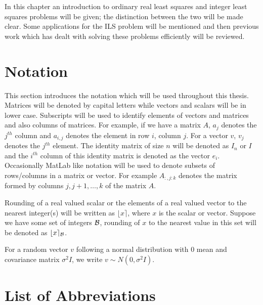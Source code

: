 \documentclass[12pt,Bold,letterpaper]{mcgilletdclass}
\begin{document}
In this chapter an introduction to ordinary real least squares and integer least squares problems will be given; the distinction between the two will be made clear. Some applications for the ILS problem will be mentioned and then previous work which has dealt with solving these problems efficiently will be reviewed. 

\section{Notation}

This section introduces the notation which will be used throughout this thesis. Matrices will be denoted by capital letters while vectors and scalars will be in lower case. Subscripts will be used to identify elements of vectors and matrices and also columns of matrices. For example, if we have a matrix $A$, $a_j$ denotes the $j^{th}$ column and $a_{i,j}$ denotes the element in row $i$, column $j$. For a vector $v$, $v_j$ denotes the $j^{th}$ element. The identity matrix of size $n$ will be denoted as $I_n$ or $I$ and the $i^{th}$ column of this identity matrix is denoted as the vector $e_i$. Occasionally MatLab like notation will be used to denote subsets of rows/columns in a matrix or vector. For example $A_{:,j:k}$ denotes the matrix formed by columns $j, j+1, \dots, k$ of the matrix $A$.

Rounding of a real valued scalar or the elements of a real valued vector to the nearest integer(s) will be written as $\lfloor x \rceil$, where $x$ is the scalar or vector. Suppose we have some set of integers ${\cal B}$, rounding of $x$ to the nearest value in this set will be denoted as  $\lfloor x \rceil_{{\cal B}}$.

For a random vector $v$ following a normal distribution with $0$ mean and covariance matrix $\sigma^2I$, we write $v \sim N(0,\sigma^2I)$.

\section{List of Abbreviations}
\end{document}
